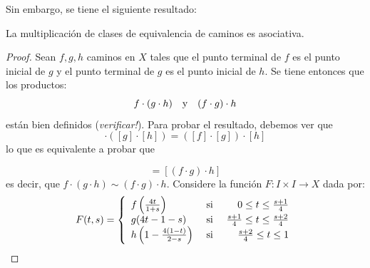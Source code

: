 \documentclass[12pt]{report}
\theoremstyle{largebreak}
\newcommand\cf[3]{\ensuremath{#1:#2\rightarrow#3}}
\begin{document}
    Sin embargo, se tiene el siguiente resultado:

    \begin{lema}
        La multiplicación de clases de equivalencia de caminos es asociativa.
    \end{lema}

    \begin{proof}
        Sean $f,g,h$ caminos en $X$ tales que el punto terminal de $f$ es el punto inicial de $g$ y el punto terminal de $g$ es el punto inicial de $h$. Se tiene entonces que los productos:
        \begin{equation*}
            f\cdot (g\cdot h)\quad\textup{y}\quad (f\cdot g)\cdot h
        \end{equation*}
        están bien definidos (\textit{verificar!}). Para probar el resultado, debemos ver que
        \begin{equation*}
            [f]\cdot \left([g]\cdot [h]\right)=\left([f]\cdot[g] \right)\cdot [h]
        \end{equation*}
        lo que es equivalente a probar que
        
        \begin{equation*}
            [f\cdot (g\cdot h)]=[(f\cdot g)\cdot h]
        \end{equation*}
        es decir, que $f\cdot (g\cdot h)\sim(f\cdot g)\cdot h$. Considere la función $\cf{F}{I\times I}{X}$ dada por:
        \begin{equation*}
            F(t,s)=\left\{
                \begin{array}{lcr}
                    f\left(\frac{4t}{1+s}\right) & \textup{ si } & 0\leq t\leq\frac{s+1}{4}\\
                    g(4t-1-s) & \textup{ si } & \frac{s+1}{4}\leq t\leq\frac{s+2}{4}\\
                    h\left(1-\frac{4(1-t)}{2-s}\right) & \textup{ si } & \frac{s+2}{4}\leq t\leq 1\\
                \end{array}
            \right.
        \end{equation*}


\end{proof}
\end{document}
